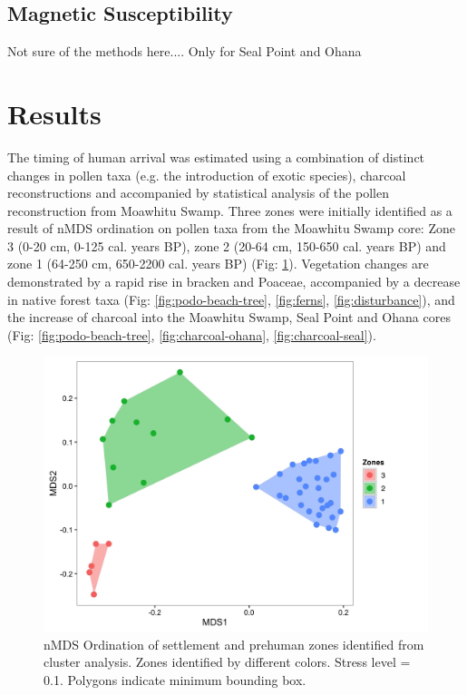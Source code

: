 \documentclass{article}
\begin{document}
\subsection {Magnetic Susceptibility}
Not sure of the methods here.... Only for Seal Point and Ohana



\section{Results}

The timing of human arrival was estimated using a combination of distinct changes
in pollen taxa (e.g. the introduction of exotic species), charcoal reconstructions and
accompanied by statistical analysis of the pollen reconstruction from Moawhitu Swamp.  Three zones were initially
identified as a result of nMDS ordination on pollen taxa from the Moawhitu Swamp core: Zone 3 (0-20 cm, 0-125 cal.
years BP), zone 2 (20-64 cm, 150-650 cal. years BP) and zone 1 (64-250 cm, 650-2200
cal. years BP) (Fig: \ref{fig:ordination}). Vegetation changes are demonstrated by a rapid rise in bracken
and Poaceae, accompanied by a decrease in native forest taxa (Fig: \ref{fig:podo-beach-tree}, \ref{fig:ferns}, \ref{fig:disturbance}), and the increase of charcoal
into the Moawhitu Swamp, Seal Point and Ohana cores (Fig: \ref{fig:podo-beach-tree}, \ref{fig:charcoal-ohana}, \ref{fig:charcoal-seal}). 



\begin{figure}[H]
	\centering
	\includegraphics[scale=0.20]{Figs/nmds-analysis.jpeg}
	\caption{nMDS Ordination of settlement and prehuman zones identified from cluster analysis.  Zones identified by different colors.  Stress level = 0.1.  Polygons indicate minimum bounding box.}
	\label{fig:ordination}
\end{figure}
\end{document}
